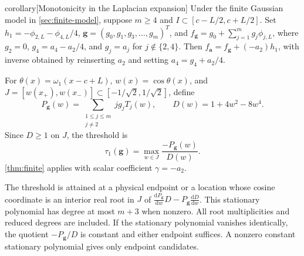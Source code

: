 \begin{theoremEnd}[combined main,category=monotone]{corollary}[Monotonicity in the Laplacian expansion]
\label{cor:monotone}
Under the finite Gaussian model in \cref{sec:finite-model}, suppose
$m\geq4$ and $I\subset[c-L/2,c+L/2]$. Set
$h_1=-\phi_{2,L}-\phi_{4,L}/4$,
$\boldsymbol g=(g_0,g_1,g_3,\ldots,g_m)^T$, and
$f_{\boldsymbol g}=g_0+\sum_{j=1}^mg_j\phi_{j,L}$, where
$g_2=0$, $g_4=a_4-a_2/4$, and $g_j=a_j$ for $j\notin\{2,4\}$.
Then $f_{\boldsymbol a}=f_{\boldsymbol g}+(-a_2)h_1$, with inverse
obtained by reinserting $a_2$ and setting $a_4=g_4+a_2/4$.

For $\theta(x)=\omega_1(x-c+L)$, $w(x)=\cos\theta(x)$, and
$J=[w(x_+),w(x_-)]\subset[-1/\sqrt2,1/\sqrt2]$, define
\begin{equation}\label{eq:monotone-polynomials}
 P_{\boldsymbol g}(w)=\sum_{\substack{1\leq j\leq m\\j\ne2}}jg_jT_j(w),
 \qquad D(w)=1+4w^2-8w^4.
\end{equation}
Since $D\geq1$ on $J$, the threshold is
\begin{equation}\label{eq:monotone-threshold}
 \tau_1(\boldsymbol g)=\max_{w\in J}\frac{-P_{\boldsymbol g}(w)}{D(w)}.
\end{equation}
\cref{thm:finite} applies with scalar coefficient $\gamma=-a_2$.

The threshold is attained at a physical endpoint or a location whose
cosine coordinate is an interior real root in $J$ of
$\frac{\mathrm{d}P_{\boldsymbol g}}{\mathrm{d}w}D-P_{\boldsymbol g}\frac{\mathrm{d}D}{\mathrm{d}w}$.
This stationary polynomial has degree at most $m+3$ when nonzero.
All root multiplicities and reduced degrees are included. If the
stationary polynomial vanishes identically, the quotient
$-P_{\boldsymbol g}/D$ is constant and either endpoint suffices.
A nonzero constant stationary polynomial gives only endpoint candidates.
\end{theoremEnd}

